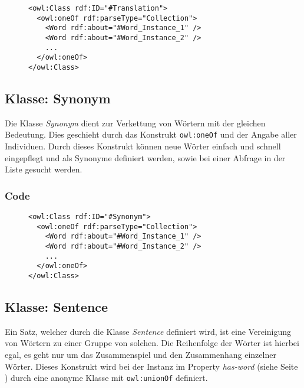 \documentclass[
    11pt,
    latin1,
    a4paper,
    oneside
]{scrreprt}
\begin{document}
\begin{figure}[h]
 \lstset{language=XML}
 \begin{lstlisting}[label=owl:translation,caption={Die Klasse \emph{Translation} beinhaltet alle \"Ubersetzungen eines Wortes}]
<owl:Class rdf:ID="#Translation">
  <owl:oneOf rdf:parseType="Collection">
    <Word rdf:about="#Word_Instance_1" />
    <Word rdf:about="#Word_Instance_2" />
    ...
  </owl:oneOf>
</owl:Class>
 \end{lstlisting}
\end{figure}

\subsection{Klasse: Synonym} \label{sec:class_synonym}

Die Klasse \emph{Synonym} dient zur Verkettung von W\"ortern mit der gleichen Bedeutung. Dies geschieht durch das Konstrukt \texttt{owl:oneOf} und der Angabe aller Individuen. Durch dieses Konstrukt k\"onnen neue W\"orter einfach und schnell eingepflegt und als Synonyme definiert werden, sowie bei einer Abfrage in der Liste gesucht werden.


\subsubsection{Code}  \label{sec:class_synonym_code}

\begin{figure}[h]
 \lstset{language=XML}
 \begin{lstlisting}[label=owl:synonym,caption={Die Klasse \emph{Synonym} beinhaltet alle W\"orter dir etwas \"ahnliches bedeuten}]
<owl:Class rdf:ID="#Synonym">
  <owl:oneOf rdf:parseType="Collection">
    <Word rdf:about="#Word_Instance_1" />
    <Word rdf:about="#Word_Instance_2" />
    ...
  </owl:oneOf>
</owl:Class>
 \end{lstlisting}
\end{figure}

\subsection{Klasse: Sentence} \label{sec:class_sentence}

Ein Satz, welcher durch die Klasse \emph{Sentence} definiert wird, ist eine Vereinigung von W\"ortern zu einer Gruppe von solchen. Die Reihenfolge der W\"orter ist hierbei egal, es geht nur um das Zusammenspiel und den Zusammenhang einzelner W\"orter. Dieses Konstrukt wird bei der Instanz im Property \emph{has-word} (siehe  Seite \pageref{sec:rel_hasword}) durch eine anonyme Klasse mit \texttt{owl:unionOf} definiert.
\end{document}
